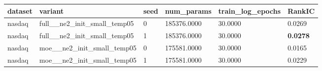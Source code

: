 \begin{tabular}{llllll}
dataset & variant & seed & num_params & train_log_epochs & RankIC \\
\hline
nasdaq & full__ne2_init_small_temp05 & 0 & 185376.0000 & 30.0000 & 0.0269 \\
nasdaq & full__ne2_init_small_temp05 & 1 & 185376.0000 & 30.0000 & \textbf{0.0278} \\
nasdaq & moe__ne2_init_small_temp05 & 0 & 175581.0000 & 30.0000 & 0.0165 \\
nasdaq & moe__ne2_init_small_temp05 & 1 & 175581.0000 & 30.0000 & 0.0229 \\
\end{tabular}
